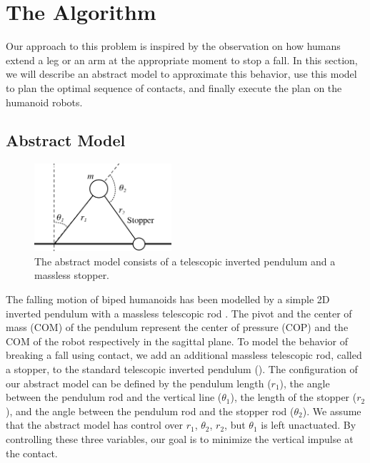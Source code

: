 \section{The Algorithm}
Our approach to this problem is inspired by the observation on how humans
extend a leg or an arm at the appropriate moment to stop a fall. In
this section, we
will describe an abstract model to approximate this behavior, use this
model to plan the optimal sequence of contacts, and finally execute
the plan on the humanoid robots.


\subsection{Abstract Model}
\begin{figure}[ht]
\center
  \includegraphics[width=2.0in]{images/tip.png}
  \caption{
    The abstract model consists of a telescopic inverted pendulum and  a massless
      stopper.}
  
  \label{fig:falling_tip}
\end{figure}
The falling motion of biped humanoids has been modelled by a simple 2D
inverted pendulum with a massless telescopic rod
\cite{Fujiwara:2003:FHH,Fujiwara:2006:TOF}. The pivot and the center
of mass (COM) of the pendulum represent the center of pressure (COP)
and the COM of the robot respectively in the sagittal plane. To model
the behavior of breaking a fall using contact, we add an additional
massless telescopic rod, called a stopper, to the standard telescopic
inverted pendulum (). The configuration of our abstract
model can be defined by the pendulum length ($r_1$), the angle between
the pendulum rod and the vertical line ($\theta_1$), the length of the
stopper ($r_2$), and the angle between the pendulum rod and the
stopper rod ($\theta_2$). We assume that the abstract model has
control over $r_1$, $\theta_2$, $r_2$, but $\theta_1$ is left
unactuated. By controlling these three variables, our goal is to
minimize the vertical impulse at the contact.

